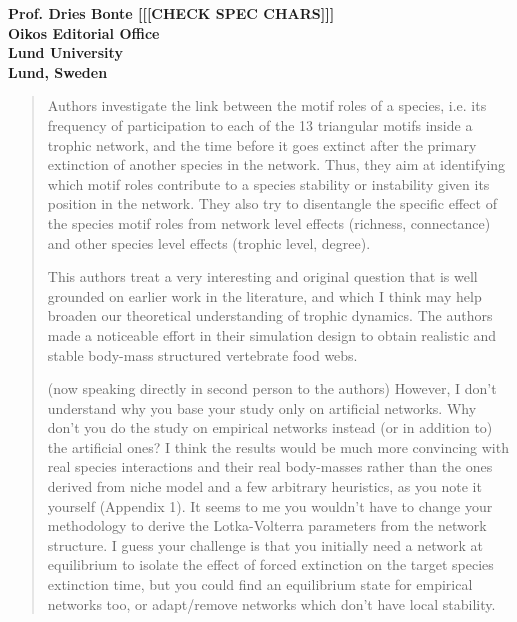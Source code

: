 \documentclass[12pt]{letter}
\begin{document}
\begin{letter}{\bf Prof. Dries Bonte [[[CHECK SPEC CHARS]]]\\
Oikos Editorial Office \\
Lund University \\
Lund, Sweden}
  \begin{quotation}
  Authors investigate the link between the motif roles of a species, i.e. its frequency of participation to each of the 13 triangular motifs inside a trophic network, and the time before it goes extinct after the primary extinction of another species in the network. Thus, they aim at identifying which motif roles contribute to a species stability or instability given its position in the network. They also try to disentangle the specific effect of the species motif roles from network level effects (richness, connectance) and other species level effects (trophic level, degree).


  This authors treat a very interesting and original question that is well grounded on earlier work in the literature, and which I think may help broaden our theoretical understanding of trophic dynamics. The authors made a noticeable effort in their simulation design to obtain realistic and stable body-mass structured vertebrate food webs.


  (now speaking directly in second person to the authors) However, I don’t understand why you base your study only on artificial networks. Why don’t you do the study on empirical networks instead (or in addition to) the artificial ones? I think the results would be much more convincing with real species interactions and their real body-masses rather than the ones derived from niche model and a few arbitrary heuristics, as you note it yourself (Appendix 1). It seems to me you wouldn’t have to change your methodology to derive the Lotka-Volterra parameters from the network structure. I guess your challenge is that you initially need a network at equilibrium to isolate the effect of forced extinction on the target species extinction time, but you could find an equilibrium state for empirical networks too, or adapt/remove networks which don’t have local stability.
  \end{quotation}



\end{letter}
\end{document}
